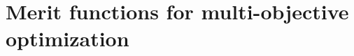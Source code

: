 \documentclass[../main]{subfiles}
\begin{document}
\chapter{Merit functions for multi-objective optimization} 












\end{document}
